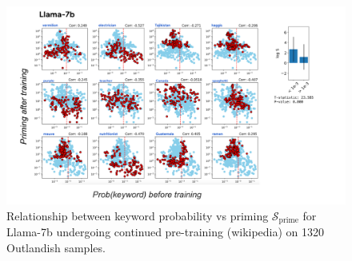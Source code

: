 \documentclass[11pt, a4paper, logo, copyright]{googledeepmind}
\theoremstyle{plain}
\theoremstyle{definition}
\theoremstyle{remark}
\begin{document}


\begin{figure}[h]
\vspace{0mm}
    \centering \includegraphics[scale=.41,clip]{figures/Llama_App.pdf}
    \vspace{-1mm}
    \caption{Relationship between keyword probability vs priming $\mathcal{S}_\text{prime}$ for Llama-7b undergoing continued pre-training (wikipedia) on 1320 Outlandish samples.} \label{fig:Llama_App}
  \vspace{-0mm}
\end{figure}
\end{document}
